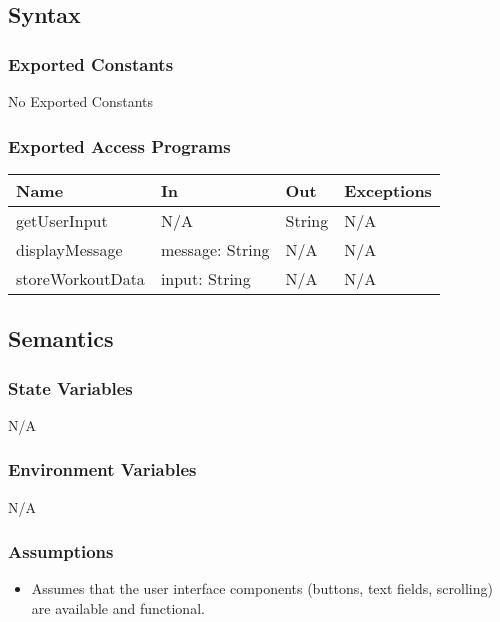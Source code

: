 \documentclass[12pt, titlepage]{article}
\begin{document}
\subsection{Syntax}

\subsubsection{Exported Constants}
No Exported Constants


\subsubsection{Exported Access Programs}

\begin{center}
\begin{tabular}{l l l l}
\hline
\textbf{Name} & \textbf{In} & \textbf{Out} & \textbf{Exceptions} \\
\hline
getUserInput & N/A & String & N/A \\
displayMessage & message: String & N/A & N/A \\
storeWorkoutData & input: String & N/A & N/A \\

\hline
\end{tabular}
\end{center}

\subsection{Semantics}

\subsubsection{State Variables}
N/A

\subsubsection{Environment Variables}
N/A

\subsubsection{Assumptions}
\begin{itemize}
\item Assumes that the user interface components (buttons, text fields, scrolling) are available and functional.
\end{itemize}
\end{document}
